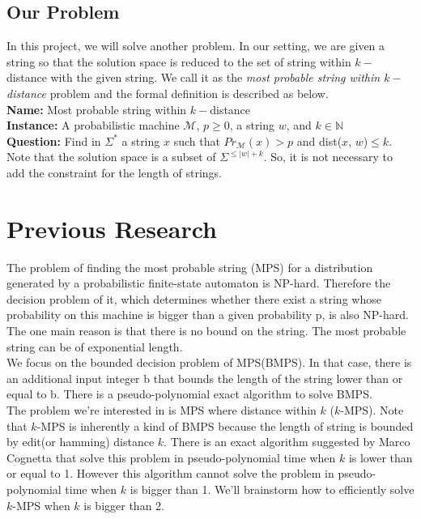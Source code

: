 \documentclass[a4paper]{article}
\begin{document}
\subsection{Our Problem}
In this project, we will solve another problem. In our setting, we are given a string so that the solution space is reduced to the set of string within $k-$distance with the given string. We call it as the \textit{most probable string within $k-$distance} problem and the formal definition is described as below. \\
\textbf{Name:} Most probable string within $k-$distance \\
\textbf{Instance:} A probabilistic machine $\mathcal{M}$, $p\geq 0$, a string $w$, and $k\in \mathbb{N}$ \\
\textbf{Question:} Find in $\Sigma^{*}$ a string $x$ such that ${Pr}_{\mathcal{M}}(x) > p$ and dist($x$, $w$)$\leq k$.\\
Note that the solution space is a subset of $\Sigma^{\leq |w|+k}$. So, it is not necessary to add the constraint for the length of strings.
\newline

\section{Previous Research}

The problem of finding the most probable string (MPS) for a distribution generated by a probabilistic finite-state automaton is NP-hard.\cite{de2013most, de2013computing} Therefore the decision problem of it, which determines whether there exist a string whose probability on this machine is bigger than a given probability p, is also NP-hard. The one main reason is that there is no bound on the string. The most probable string can be of exponential length.\cite{de2013most, de2013computing}\\

We focus on the bounded decision problem of MPS(BMPS). In that case, there is an additional input integer b that bounds the length of the string lower than or equal to b. There is a pseudo-polynomial exact algorithm to solve BMPS.\cite{de2013most, de2013computing}\\

The problem we're interested in is MPS where distance within $k$ ($k$-MPS). Note that $k$-MPS is inherently a kind of BMPS because the length of string is bounded by edit(or hamming) distance $k$. There is an exact algorithm suggested by Marco Cognetta that solve this problem in pseudo-polynomial time when $k$ is lower than or equal to 1. However this algorithm cannot solve the problem in pseudo-polynomial time when $k$ is bigger than 1. We'll brainstorm how to efficiently solve $k$-MPS when $k$ is bigger than 2.
\end{document}
